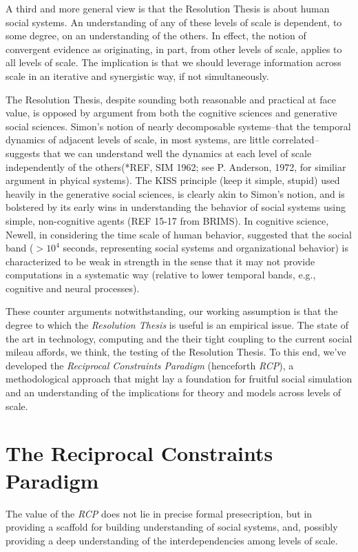 \documentclass{article}
\begin{document}
A third and more general view is that the Resolution Thesis is about human social systems.  An understanding of any of these levels of scale is dependent, to some degree, on an understanding of the others.  In effect, the notion of convergent evidence as originating, in part, from other levels of scale, applies to all levels of scale.  The implication is that we should leverage information across scale in an iterative and synergistic way, if not simultaneously. 

The Resolution Thesis, despite sounding both reasonable and practical at face value, is opposed by argument from both the cognitive sciences and generative social sciences.  Simon's notion of nearly decomposable systems--that the temporal dynamics of adjacent levels of scale, in most systems, are little correlated--suggests that we can understand well the dynamics at each level of scale independently of the others(*REF, SIM 1962; see P. Anderson, 1972, for similiar argument in phyical systems).  The KISS principle (keep it simple, stupid) used heavily in the generative social sciences, is clearly akin to Simon's notion, and is bolstered by its early wins in understanding the behavior of social systems using simple, non-cognitive agents (REF 15-17 from BRIMS).  In cognitive science, Newell, in considering the time scale of human behavior, suggested that the social band ($> 10^4$ seconds, representing social systems and organizational behavior) is characterized to be weak in strength in the sense that it may not provide computations in a systematic way (relative to lower temporal bands, e.g., cognitive and neural processes).  

These counter arguments notwithstanding, our working assumption is that the degree to which the  \textit{Resolution Thesis} is useful is an empirical issue.  The state of the art in technology, computing and the their tight coupling to the current social mileau affords, we think, the testing of the Resolution Thesis.   To this end, we've developed the \textit{Reciprocal Constraints Paradigm} (henceforth \textit{RCP}), a methodological approach that might lay a foundation for fruitful social simulation and an understanding of the implications for theory and models across levels of scale.


\section{The Reciprocal Constraints Paradigm}
The value of the \textit{RCP} does not lie in precise formal presecription, but in providing a scaffold for building understanding of social systems, and, possibly providing a deep understanding of the interdependencies among levels of scale.  
\end{document}
